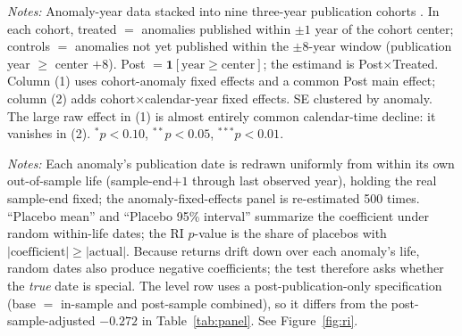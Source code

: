 \documentclass[12pt]{article}
\begin{document}
\begin{table}[htbp]\centering
\begin{threeparttable}
\caption{Not-yet-published-control stacked difference-in-differences}\label{tab:stacked}\small

\begin{tablenotes}\small\item \textit{Notes:} Anomaly-year data stacked into nine three-year
publication cohorts \citep{cengiz2019}. In each cohort, treated $=$ anomalies published within
$\pm1$ year of the cohort center; controls $=$ anomalies not yet published within the $\pm8$-year
window (publication year $\ge$ center $+8$). Post $=\mathbf{1}[\text{year}\ge\text{center}]$; the
estimand is Post$\times$Treated. Column (1) uses cohort-anomaly fixed effects and a common Post
main effect; column (2) adds cohort$\times$calendar-year fixed effects. SE clustered by anomaly.
The large raw effect in (1) is almost entirely common calendar-time decline: it vanishes in (2).
$^{*}p<0.10$, $^{**}p<0.05$, $^{***}p<0.01$.
\end{tablenotes}
\end{threeparttable}
\end{table}

\begin{table}[htbp]\centering
\begin{threeparttable}
\caption{Randomization / timing-specificity inference (500 permutations)}\label{tab:ri}\small

\begin{tablenotes}\small\item \textit{Notes:} Each anomaly's publication date is redrawn
uniformly from within its own out-of-sample life (sample-end$+1$ through last observed year),
holding the real sample-end fixed; the anomaly-fixed-effects panel is re-estimated 500 times.
``Placebo mean'' and ``Placebo 95\% interval'' summarize the coefficient under random within-life
dates; the RI $p$-value is the share of placebos with $|\text{coefficient}|\ge|\text{actual}|$.
Because returns drift down over each anomaly's life, random dates also produce negative
coefficients; the test therefore asks whether the \emph{true} date is special. The level row
uses a post-publication-only specification (base $=$ in-sample and post-sample combined), so it
differs from the post-sample-adjusted $-0.272$ in Table~\ref{tab:panel}. See
Figure~\ref{fig:ri}.
\end{tablenotes}
\end{threeparttable}
\end{table}
\end{document}
